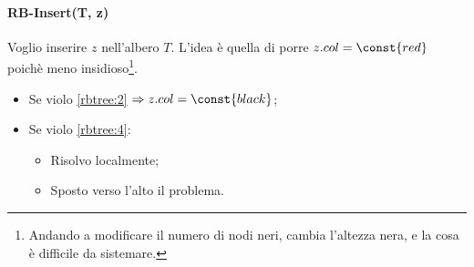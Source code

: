 

\paragraph{RB-Insert(T, z)} Voglio inserire $z$ nell'albero $T$.
L'idea è quella di porre $z.col = \const{red}$ poichè meno insidioso\footnote{Andando a modificare il numero di nodi neri, cambia l'altezza nera, e la cosa è difficile da sistemare.}.
\begin{itemize}
    \item Se violo \ref{rbtree:2} $\Rightarrow z.col = \const{black}$;
    \item Se violo \ref{rbtree:4}:
    \begin{itemize}
        \item Risolvo localmente;
        \item Sposto verso l'alto il problema.
    \end{itemize}
\end{itemize}

